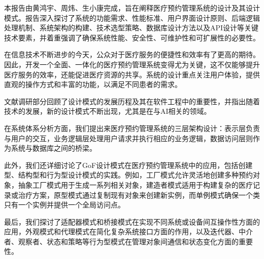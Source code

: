 本报告由黄鸿宇、周炜、生小康完成，旨在阐释医疗预约管理系统的设计及其设计模式。报告深入探讨了系统的功能需求、性能标准、用户界面设计原则、后端逻辑处理机制、系统架构的构建、技术选型策略、数据库设计方法以及API设计等关键技术要素，并着重强调了确保系统性能、安全性、可维护性和可扩展性的必要性。

在信息技术不断进步的今天，公众对于医疗服务的便捷性和效率有了更高的期待。因此，开发一个全面、一体化的医疗预约管理系统变得尤为关键，这不仅能够提升医疗服务的效率，还能促进医疗资源的共享。系统的设计重点关注用户体验，提供直观的操作方式和丰富的功能，以满足不同患者的需求。

文献调研部分回顾了设计模式的发展历程及其在软件工程中的重要性，并指出随着技术的发展，新的设计模式不断出现，尤其是在与AI相关的领域。

在系统体系分析方面，我们提出来医疗预约管理系统的三层架构设计：表示层负责与用户的交互，业务逻辑层处理用户请求并执行相应的业务逻辑，数据访问层则作为系统与数据库之间的桥梁。

此外，我们还详细讨论了GoF设计模式在医疗预约管理系统中的应用，包括创建型、结构型和行为型设计模式的实践。例如，工厂模式允许灵活地创建多种预约对象，抽象工厂模式用于生成一系列相关对象，建造者模式适用于构建复杂的医疗记录或治疗方案，原型模式通过复制现有对象来创建新实例，而单例模式确保一个类只有一个实例并提供一个全局访问点。

最后，我们探讨了适配器模式和桥接模式在实现不同系统或设备间互操作性方面的应用，外观模式和代理模式在简化复杂系统接口方面的作用，以及迭代器、中介者、观察者、状态和策略等行为型模式在管理对象间通信和状态变化方面的重要性。
